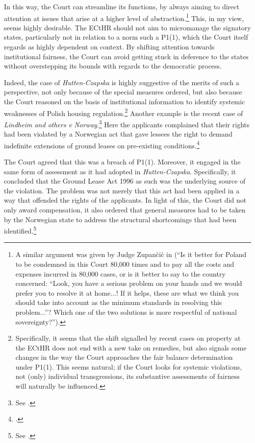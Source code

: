 In this way, the Court can streamline its functions, by always aiming to direct attention at issues that arise at a higher level of abstraction.\footnote{A similar argument was given by Judge Zupan\u{c}i\u{c} in \cite{hutten06} (``Is it better for Poland to be condemned in this Court 80,000 times and to pay all the costs and expenses incurred in 80,000 cases, or is it better to say to the country concerned: “Look, you have a serious problem on your hands and we would prefer you to resolve it at home...! If it helps, these are what we think you should take into account as the minimum standards in resolving this problem...”? Which one of the two solutions is more respectful of national sovereignty?'').} This, in my view, seems highly desirable. The ECtHR should not aim to micromanage the signatory states, particularly not in relation to a norm such a P1(1), which the Court itself regards as highly dependent on context. By shifting attention towards institutional fairness, the Court can avoid getting stuck in deference to the states without overstepping its bounds with regards to the democratic process.

Indeed, the case of {\it Hutten-Czapska} is highly suggestive of the merits of such a perspective, not only because of the special measures ordered, but also because the Court reasoned on the basis of institutional information to identify systemic weaknesses of Polish housing regulation.\footnote{Specifically, it seems that the shift signalled by recent cases on property at the ECtHR does not end with a new take on remedies, but also signals some changes in the way the Court approaches the fair balance determination under P1(1). This seems natural; if the Court looks for systemic violations, not (only) individual transgressions, its substantive assessments of fairness will naturally be influenced.} Another example is the recent case of {\it Lindheim and others v Norway}.\footnote{See \cite{lindheim12}.} Here the applicants complained that their rights had been violated by a Norwegian act that gave lessees the right to demand indefinite extensions of ground leases on pre-existing conditions.\footcite[119]{lindheim12}

The Court agreed that this was a breach of P1(1). Moreover, it engaged in the same form of assessment as it had adopted in {\it Hutten-Czapska}. Specifically, it concluded that the Ground Lease Act 1996 as such was the underlying source of the violation. The problem was not merely that this act had been applied in a way that offended the rights of the applicants. In light of this, the Court did not only award compensation, it also ordered that general measures had to be taken by the Norwegian state to address the structural shortcomings that had been identified.\footnote{See \cite{lindheim12}.}

